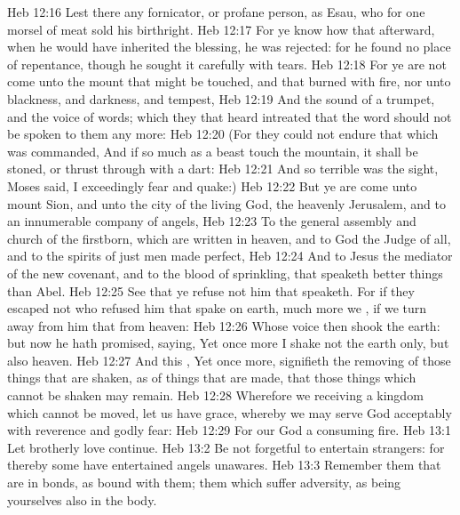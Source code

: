 \vs Heb 12:16 Lest there  any fornicator, or profane person, as Esau, who for one morsel of meat sold his birthright.
\vs Heb 12:17 For ye know how that afterward, when he would have inherited the blessing, he was rejected: for he found no place of repentance, though he sought it carefully with tears.
\vs Heb 12:18 For ye are not come unto the mount that might be touched, and that burned with fire, nor unto blackness, and darkness, and tempest,
\vs Heb 12:19 And the sound of a trumpet, and the voice of words; which  they that heard intreated that the word should not be spoken to them any more:
\vs Heb 12:20 (For they could not endure that which was commanded, And if so much as a beast touch the mountain, it shall be stoned, or thrust through with a dart:
\vs Heb 12:21 And so terrible was the sight,  Moses said, I exceedingly fear and quake:)
\vs Heb 12:22 But ye are come unto mount Sion, and unto the city of the living God, the heavenly Jerusalem, and to an innumerable company of angels,
\vs Heb 12:23 To the general assembly and church of the firstborn, which are written in heaven, and to God the Judge of all, and to the spirits of just men made perfect,
\vs Heb 12:24 And to Jesus the mediator of the new covenant, and to the blood of sprinkling, that speaketh better things than  Abel.
\vs Heb 12:25 See that ye refuse not him that speaketh. For if they escaped not who refused him that spake on earth, much more  we , if we turn away from him that  from heaven:
\vs Heb 12:26 Whose voice then shook the earth: but now he hath promised, saying, Yet once more I shake not the earth only, but also heaven.
\vs Heb 12:27 And this , Yet once more, signifieth the removing of those things that are shaken, as of things that are made, that those things which cannot be shaken may remain.
\vs Heb 12:28 Wherefore we receiving a kingdom which cannot be moved, let us have grace, whereby we may serve God acceptably with reverence and godly fear:
\vs Heb 12:29 For our God  a consuming fire.
\vs Heb 13:1 Let brotherly love continue.
\vs Heb 13:2 Be not forgetful to entertain strangers: for thereby some have entertained angels unawares.
\vs Heb 13:3 Re\-mem\-ber them that are in bonds, as bound with them;  them which suffer adversity, as being yourselves also in the body.
